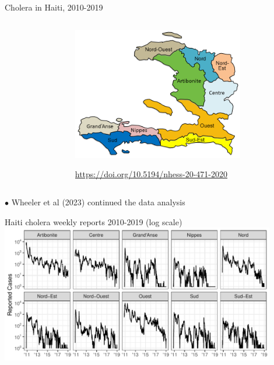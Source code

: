 \documentclass{beamer}
\begin{document}
\begin{frame}{Cholera in Haiti, 2010-2019}
\begin{columns}[T]
\begin{column}{.35\textwidth}
\end{column}

\begin{column}{.62\textwidth}
  \includegraphics[width=7.5cm]{haiti/haiti.png}

  \vspace{-3mm}
  
  \begin{center}
    {  \tiny \url{https://doi.org/10.5194/nhess-20-471-2020}}
  \end{center}
  

\end{column}

\end{columns}

  \vspace{4mm}
  
   $\bullet$ Wheeler et al (2023) continued the data analysis

\end{frame}

\begin{frame}{Haiti cholera weekly reports 2010-2019 (log scale)}
\includegraphics[width=12cm]{haiti/Plot_Reported_Cases-1.pdf}
\end{frame}
\end{document}
